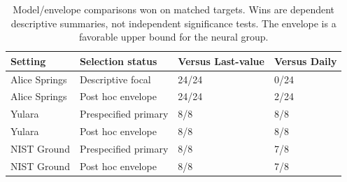 \begin{table}[!tp]
\centering\small
\caption{Model/envelope comparisons won on matched targets. Wins are dependent descriptive summaries, not independent significance tests. The envelope is a favorable upper bound for the neural group.}
\label{tab:cross}
\begin{tabular}{llll}
\toprule Setting & Selection status & Versus Last-value & Versus Daily\\\midrule
Alice Springs & Descriptive focal & 24/24 & 0/24\\
Alice Springs & Post hoc envelope & 24/24 & 2/24\\
Yulara & Prespecified primary & 8/8 & 8/8\\
Yulara & Post hoc envelope & 8/8 & 8/8\\
NIST Ground & Prespecified primary & 8/8 & 7/8\\
NIST Ground & Post hoc envelope & 8/8 & 7/8\\
\bottomrule\end{tabular}
\end{table}
